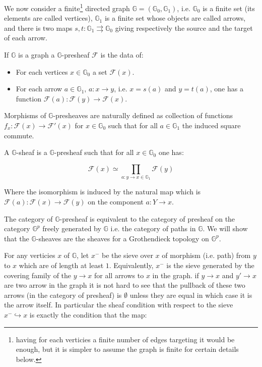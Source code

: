 \documentclass[a4paper]{article}
\newcommand{\G}{\mathbb{G}}
\newcommand{\Fcal}{\mathcal{F}}
\newcommand{\block}[1]
{

\par \subsubsection{} #1

\bigskip}
\begin{document}
\block{\label{example_Graph}We now consider a finite\footnote{having for each verticies a finite number of edges targeting it would be enough, but it is simpler to assume the graph is finite for certain details below.} directed graph $\G = (\G_0,\G_1)$, i.e. $\G_0$ is a finite set (its elements are called vertices), $\G_1$ is a finite set whose objects are called arrows, and there is two maps $s,t : \G_1 \rightrightarrows \G_0$ giving respectively the source and the target of each arrow.

\bigskip

If $\G$ is a graph a $\G$-presheaf $\Fcal$ is the data of:

\begin{itemize}

\item For each vertices $x \in \G_0$ a set $\Fcal(x)$.

\item For each arrow $a \in \G_1$, $a:x \rightarrow y$, i.e. $x=s(a)$ and $y=t(a)$, one has a function $\Fcal(a):\Fcal(y) \rightarrow \Fcal(x)$.

\end{itemize}
Morphisms of $\G$-presheaves are naturally defined as collection of functions $f_x: \Fcal(x) \rightarrow \Fcal'(x)$ for $x \in \G_0$ such that for all $a \in \G_1$ the induced square commute.

A $\G$-sheaf is a $\G$-presheaf such that for all $x \in \G_0$ one has:

\[ \Fcal(x) \simeq \prod_{a: y \rightarrow x \in \G_1} \Fcal(y) \]

Where the isomorphism is induced by the natural map which is $\Fcal(a) : \Fcal(x) \rightarrow \Fcal(y)$ on the component $a :Y \rightarrow x$.


The category of $\G$-presheaf is equivalent to the category of presheaf on the category $\G^p$ freely generated by $\G$ i.e. the category of paths in $\G$. We will show that the $\G$-sheaves are the sheaves for a Grothendieck topology on $\G^p$.

For any verticies $x$ of $\G$, let $x^-$ be the sieve over $x$ of morphism (i.e. path) from $y$ to $x$ which are of length at least $1$. Equivalently, $x^-$ is the sieve generated by the covering family of the $y \rightarrow x$ for all arrows to $x$ in the graph. if $y \rightarrow x$ and $y' \rightarrow x$ are two arrow in the graph it is not hard to see that the pullback of these two arrows (in the category of presheaf) is $\emptyset$ unless they are equal in which case it is the arrow itself. In particular the sheaf condition with respect to the sieve $x^- \hookrightarrow x$ is exactly the condition that the map:


}
\end{document}

